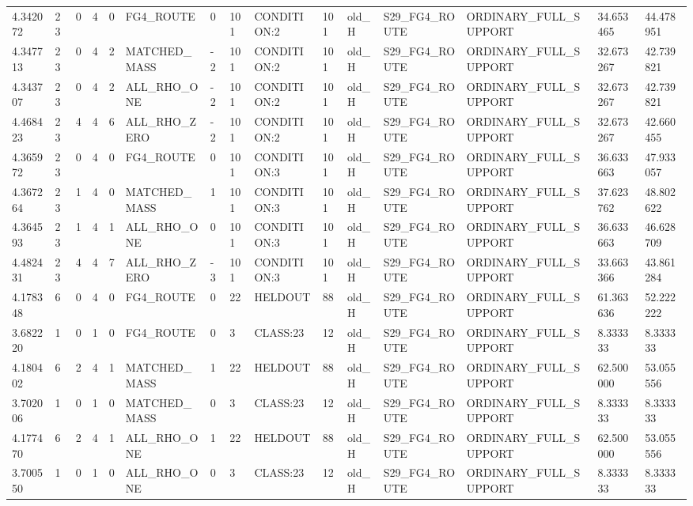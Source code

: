 \begin{tabular}{lllllllllllllll}
4.342072 & 23 & 0 & 4 & 0 & FG4\_ROUTE & 0 & 101 & CONDITION:2 & 101 & old\_H & S29\_FG4\_ROUTE & ORDINARY\_FULL\_SUPPORT & 34.653465 & 44.478951 \\
4.347713 & 23 & 0 & 4 & 2 & MATCHED\_MASS & -2 & 101 & CONDITION:2 & 101 & old\_H & S29\_FG4\_ROUTE & ORDINARY\_FULL\_SUPPORT & 32.673267 & 42.739821 \\
4.343707 & 23 & 0 & 4 & 2 & ALL\_RHO\_ONE & -2 & 101 & CONDITION:2 & 101 & old\_H & S29\_FG4\_ROUTE & ORDINARY\_FULL\_SUPPORT & 32.673267 & 42.739821 \\
4.468423 & 23 & 4 & 4 & 6 & ALL\_RHO\_ZERO & -2 & 101 & CONDITION:2 & 101 & old\_H & S29\_FG4\_ROUTE & ORDINARY\_FULL\_SUPPORT & 32.673267 & 42.660455 \\
4.365972 & 23 & 0 & 4 & 0 & FG4\_ROUTE & 0 & 101 & CONDITION:3 & 101 & old\_H & S29\_FG4\_ROUTE & ORDINARY\_FULL\_SUPPORT & 36.633663 & 47.933057 \\
4.367264 & 23 & 1 & 4 & 0 & MATCHED\_MASS & 1 & 101 & CONDITION:3 & 101 & old\_H & S29\_FG4\_ROUTE & ORDINARY\_FULL\_SUPPORT & 37.623762 & 48.802622 \\
4.364593 & 23 & 1 & 4 & 1 & ALL\_RHO\_ONE & 0 & 101 & CONDITION:3 & 101 & old\_H & S29\_FG4\_ROUTE & ORDINARY\_FULL\_SUPPORT & 36.633663 & 46.628709 \\
4.482431 & 23 & 4 & 4 & 7 & ALL\_RHO\_ZERO & -3 & 101 & CONDITION:3 & 101 & old\_H & S29\_FG4\_ROUTE & ORDINARY\_FULL\_SUPPORT & 33.663366 & 43.861284 \\
4.178348 & 6 & 0 & 4 & 0 & FG4\_ROUTE & 0 & 22 & HELDOUT & 88 & old\_H & S29\_FG4\_ROUTE & ORDINARY\_FULL\_SUPPORT & 61.363636 & 52.222222 \\
3.682220 & 1 & 0 & 1 & 0 & FG4\_ROUTE & 0 & 3 & CLASS:23 & 12 & old\_H & S29\_FG4\_ROUTE & ORDINARY\_FULL\_SUPPORT & 8.333333 & 8.333333 \\
4.180402 & 6 & 2 & 4 & 1 & MATCHED\_MASS & 1 & 22 & HELDOUT & 88 & old\_H & S29\_FG4\_ROUTE & ORDINARY\_FULL\_SUPPORT & 62.500000 & 53.055556 \\
3.702006 & 1 & 0 & 1 & 0 & MATCHED\_MASS & 0 & 3 & CLASS:23 & 12 & old\_H & S29\_FG4\_ROUTE & ORDINARY\_FULL\_SUPPORT & 8.333333 & 8.333333 \\
4.177470 & 6 & 2 & 4 & 1 & ALL\_RHO\_ONE & 1 & 22 & HELDOUT & 88 & old\_H & S29\_FG4\_ROUTE & ORDINARY\_FULL\_SUPPORT & 62.500000 & 53.055556 \\
3.700550 & 1 & 0 & 1 & 0 & ALL\_RHO\_ONE & 0 & 3 & CLASS:23 & 12 & old\_H & S29\_FG4\_ROUTE & ORDINARY\_FULL\_SUPPORT & 8.333333 & 8.333333 \\

\end{tabular}
